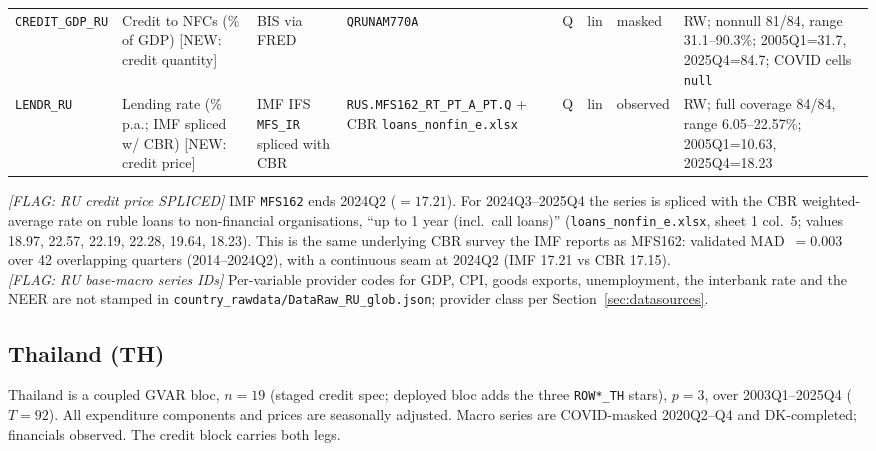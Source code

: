 {\begin{longtable}{p{2.3cm}p{3.3cm}p{2.1cm}p{2.2cm}p{0.6cm}p{1.4cm}p{1.9cm}p{2.4cm}}
\texttt{CREDIT\_GDP\_RU} & Credit to NFCs (\% of GDP) [NEW: credit quantity] & BIS via FRED & \texttt{QRUNAM770A} & Q & lin & masked & RW; nonnull 81/84, range 31.1--90.3\%; 2005Q1=31.7, 2025Q4=84.7; COVID cells \texttt{null} \\
\texttt{LENDR\_RU}  & Lending rate (\% p.a.; IMF spliced w/ CBR) [NEW: credit price] & IMF IFS \texttt{MFS\_IR} spliced with CBR & \texttt{RUS.\allowbreak MFS162\_RT\_PT\_A\_PT.\allowbreak Q} + CBR \texttt{loans\_nonfin\_e.xlsx} & Q & lin & observed & RW; full coverage 84/84, range 6.05--22.57\%; 2005Q1=10.63, 2025Q4=18.23 \\
\end{longtable}}

\noindent\textit{[FLAG: RU credit price SPLICED]} IMF \texttt{MFS162} ends
2024Q2 ($=17.21$). For 2024Q3--2025Q4 the series is spliced with the CBR
weighted-average rate on ruble loans to non-financial organisations, ``up to 1
year (incl.\ call loans)'' (\texttt{loans\_nonfin\_e.xlsx}, sheet 1 col.\ 5;
values 18.97, 22.57, 22.19, 22.28, 19.64, 18.23). This is the same underlying
CBR survey the IMF reports as MFS162: validated MAD~$=0.003$ over 42 overlapping
quarters (2014--2024Q2), with a continuous seam at 2024Q2 (IMF 17.21 vs CBR
17.15).\\
\textit{[FLAG: RU base-macro series IDs]} Per-variable provider codes for GDP,
CPI, goods exports, unemployment, the interbank rate and the NEER are not
stamped in \texttt{country\_rawdata/DataRaw\_RU\_glob.json}; provider class per
Section~\ref{sec:datasources}.

\subsection{Thailand (TH)}\label{sec:data:TH}

Thailand is a coupled GVAR bloc, $n=19$ (staged credit spec; deployed bloc adds
the three \texttt{ROW*\_TH} stars), $p=3$, over 2003Q1--2025Q4 ($T=92$). All
expenditure components and prices are seasonally adjusted. Macro series are
COVID-masked 2020Q2--Q4 and DK-completed; financials observed. The credit block
carries both legs.

